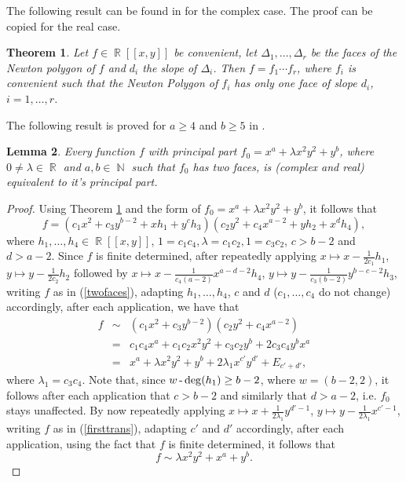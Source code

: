 \documentclass[noend]{amsproc}
\newtheorem{theorem}{Theorem}
\newtheorem{lemma}[theorem]{Lemma}
\theoremstyle{definition}
\DeclareMathOperator{\N}{\mathbb{N}}
\DeclareMathOperator{\R}{\mathbb{R}}
\DeclareMathOperator{\dash}{\textnormal{-}}
\begin{document}
The following result can be found in \cite{PdJ2000} for the complex case. The proof can be copied for the real case.

\begin{theorem}\label{faces}
Let $f\in\R[[x,y]]$ be convenient, let $\Delta_1,\ldots,\Delta_r$ be the faces of the Newton polygon of $f$ and $d_i$ the slope of $\Delta_i$. Then $f=f_1\cdots f_r$, where $f_i$ is convenient such that the Newton Polygon of $f_i$ has only one face of slope $d_i$, $i=1,\ldots,r$.
\end{theorem}

The following result is proved for $a\ge 4$ and $b\ge 5$ in \cite{AVG1985}.
\begin{lemma}\label{principalpart}
Every function $f$ with principal part $f_0=x^a+\lambda x^2y^2+y^b$, where $0\neq\lambda\in\R$ and $a,b\in\N$ such that $f_0$ has two faces, is (complex and real) equivalent to it's principal part.
\end{lemma}
\begin{proof}
Using Theorem \ref{faces} and the form of $f_0=x^a+\lambda x^2y^2+y^b$, it follows that 
\begin{equation}\label{twofaces}
f=(c_1x^2+c_3y^{b-2}+xh_1+y^ch_3)(c_2y^2+c_4x^{a-2}+yh_2+x^dh_4),
\end{equation}
where $h_1,\ldots,h_4\in\R[[x,y]]$, $1=c_1c_4, \lambda=c_1c_2, 1=c_3c_2$, $c>b-2$ and $d>a-2$. Since $f$ is finite determined, after repeatedly applying $x\mapsto x-\frac{1}{2c_1}h_1$, $y\mapsto y-\frac{1}{2c_2}h_2$ followed by $x\mapsto x-\frac{1}{c_4(a-2)}x^{a-d-2}h_4$, $y\mapsto y-\frac{1}{c_3(b-2)}y^{b-c-2} h_3$, writing $f$ as in (\ref{twofaces}), adapting $h_1,\ldots,h_4$, $c$ and $d$ ($c_1,\ldots,c_4$ do not change) accordingly, after each application, we have that 
\begin{eqnarray}
f&\sim& (c_1x^2+c_3y^{b-2})(c_2y^2+c_4x^{a-2})\nonumber\\
&=&c_1c_4x^a+c_1c_2x^2y^2+c_3c_2y^b+2c_3c_4y^bx^a\nonumber\\
&=&x^a+\lambda x^2y^2+y^b+2\lambda_1x^{c'}y^{d'}+E_{c'+d'},\label{firsttrans}
\end{eqnarray}
where $\lambda_1=c_3c_4$. Note that, since $w\dash\deg(h_1)\ge b-2$, where $w=(b-2,2)$, it follows after each application that $c>b-2$ and similarly that $d>a-2$, i.e. $f_0$ stays unaffected. By now repeatedly applying $x\mapsto x+\frac{1}{2\lambda_1}y^{d'-1}$, $y\mapsto y-\frac{1}{2\lambda_1}x^{c'-1}$, writing $f$ as in (\ref{firsttrans}), adapting $c'$ and $d'$ accordingly, after each application, using the fact that $f$ is finite determined, it follows that
\[f\sim \lambda x^2y^2+x^a+y^b.\]
\end{proof}
\end{document}
